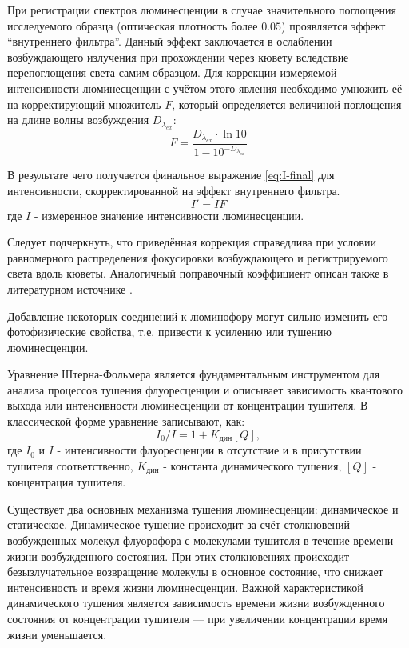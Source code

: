 \documentclass[a4paper, 12pt]{article}
\begin{document}
\begin{onehalfspace}
		\label{subsubsec:em-correction}
		При регистрации спектров люминесценции в случае значительного поглощения исследуемого образца (оптическая плотность более $0.05$) проявляется эффект \enquote{внутреннего фильтра}. Данный эффект заключается в ослаблении возбуждающего излучения при прохождении через кювету вследствие перепоглощения света самим образцом. Для коррекции измеряемой интенсивности люминесценции с учётом этого явления необходимо умножить её на корректирующий множитель $F$, который определяется величиной поглощения на длине волны возбуждения $D_{\lambda_{ex}}$:
		\begin{equation}
		F = \frac{D_{\lambda_{ex}} \cdot \ln 10}{1 - 10^{-D_{\lambda_{ex}}}}
		\end{equation}

		В результате чего получается финальное выражение \eqref{eq:I-final} для интенсивности, скорректированной на эффект внутреннего фильтра.
		\begin{equation}
		I' = IF
		\label{eq:I-final}
		\end{equation}
		где $I$ - измеренное значение интенсивности люминесценции.

		Следует подчеркнуть, что приведённая коррекция справедлива при условии равномерного распределения фокусировки возбуждающего и регистрируемого света вдоль кюветы. Аналогичный поправочный коэффициент описан также в литературном источнике \cite{parker1968photoluminescence}.

		Добавление некоторых соединений к люминофору могут сильно изменить его фотофизические свойства, т.е. привести к усилению или тушению люминесценции.

		Уравнение Штерна-Фольмера является фундаментальным инструментом для анализа процессов тушения флуоресценции и описывает зависимость квантового выхода или интенсивности люминесценции от концентрации тушителя. \label{subsubsec:StV}
		В классической форме уравнение записывают, как:
		\begin{equation}
			I_0 / I = 1+K_{\text{дин}}[Q],
		\end{equation}
		где $I_0$ и $I$ -  интенсивности флуоресценции в отсутствие и в присутствии тушителя соответственно, $K_{\text{дин}}$ - константа динамического тушения, $[Q]$ - концентрация тушителя.

		Существует два основных механизма тушения люминесценции: динамическое и статическое.
		Динамическое тушение происходит за счёт столкновений возбужденных молекул флуорофора с молекулами тушителя в течение времени жизни возбужденного состояния. При этих столкновениях происходит безызлучательное возвращение молекулы в основное состояние, что снижает интенсивность и время жизни люминесценции. Важной характеристикой динамического тушения является зависимость времени жизни возбужденного состояния от концентрации тушителя — при увеличении концентрации время жизни уменьшается.


\end{onehalfspace}
\end{document}
